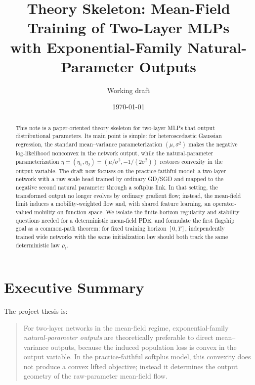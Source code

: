 \documentclass[11pt]{article}
\title{Theory Skeleton: Mean-Field Training of Two-Layer MLPs\\with Exponential-Family Natural-Parameter Outputs}
\author{Working draft}
\date{\today}
\theoremstyle{definition}
\begin{document}
\maketitle

\begin{abstract}
This note is a paper-oriented theory skeleton for two-layer MLPs that output
distributional parameters. Its main point is simple: for heteroscedastic
Gaussian regression, the standard mean--variance parameterization
$(\mu,\sigma^2)$ makes the negative log-likelihood nonconvex in the network
output, while the natural-parameter parameterization
$\eta=(\eta_1,\eta_2)=(\mu/\sigma^2,-1/(2\sigma^2))$ restores convexity in the
output variable. The draft now focuses on the practice-faithful model: a
two-layer network with a raw scale head trained by ordinary GD/SGD and mapped
to the negative second natural parameter through a softplus link. In that
setting, the transformed output no longer evolves by ordinary gradient flow;
instead, the mean-field limit induces a mobility-weighted flow and, with shared
feature learning, an operator-valued mobility on function space. We isolate the
finite-horizon regularity and stability questions needed for a deterministic
mean-field PDE, and formulate the first flagship goal as a common-path theorem:
for fixed training horizon $[0,T]$, independently trained wide networks with
the same initialization law should both track the same deterministic law
$\rho_t$.
\end{abstract}

\section{Executive Summary}

The project thesis is:
\begin{quote}
For two-layer networks in the mean-field regime, exponential-family
\emph{natural-parameter outputs} are theoretically preferable to direct
mean--variance outputs, because the induced population loss is convex in the
output variable. In the practice-faithful softplus model, this convexity does
not produce a convex lifted objective; instead it determines the output
geometry of the raw-parameter mean-field flow.
\end{quote}
\end{document}
